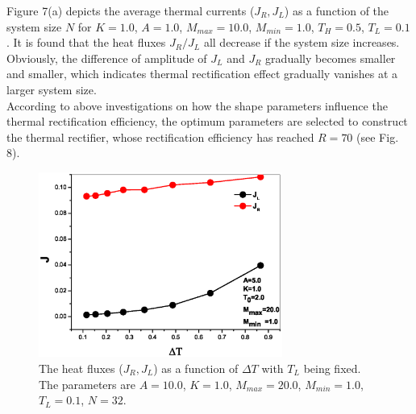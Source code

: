 \documentclass[pra,preprint,superscriptaddress,showkeys,showpacs]{revtex4}
\begin{document}
\indent Figure 7(a) depicts the average thermal currents
($J_{R},J_{L}$) as a function of the system size $N$ for $K=1.0$,
$A=1.0$, $M_{max}=10.0$, $M_{min}=1.0$, $T_{H}=0.5$, $T_{L}=0.1$. It
is found that the heat fluxes $J_{R}/J_{L}$ all decrease if the
system size increases. Obviously, the difference of amplitude of
$J_{L}$ and $J_{R}$ gradually becomes
  smaller and smaller, which indicates thermal rectification effect gradually vanishes at a larger system size.\\
\indent According to above investigations on how the shape
parameters influence the thermal rectification efficiency, the
optimum parameters are selected to construct the thermal rectifier,
whose rectification efficiency has reached
$R=70$ (see Fig. 8).\\
\begin{figure}
\centering
\includegraphics[width=8cm]{fig8.eps}
\caption{The heat fluxes ($J_{R},J_{L}$) as a function of $\Delta T$
with $T_{L}$ being fixed. The parameters are $A=10.0$, $K=1.0$,
$M_{max}=20.0$, $M_{min}=1.0$, $T_{L}=0.1$, $N=32$.}
\end{figure}
\end{document}
